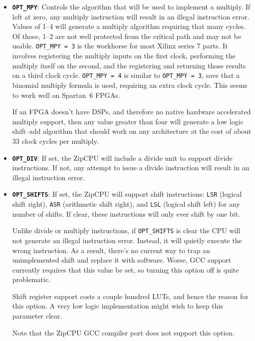 \documentclass{gqtekspec}
\begin{document}
\begin{itemize}
\item {\bf\tt OPT\_MPY}: Controls the algorithm that will be used to implement
	a multiply.  If left at zero, any multiply instruction will result in
	an illegal instruction error.  Values of 1--4 will generate a multiply
	algorithm requiring that many cycles.  Of those, 1--2 are not well
	protected from the critical path and may not be usable.
	{\tt  OPT\_MPY = 3} is the workhorse for most Xilinx series 7 parts.
	It involves registering the multiply inputs on the first clock,
	performing the multiply itself on the second, and the registering and
	returning those results on a third clock cycle.  {\tt  OPT\_MPY = 4}
	is similar to {\tt OPT\_MPY = 3}, save that a binomial multiply formula
	is used, requiring an extra clock cycle.  This seems to work well on
	Spartan~6 FPGAs.

	If an FPGA doesn't have DSPs, and therefore no native hardware
	accelerated multiply support, then any value greater than four will
	generate a low logic shift--add algorithm that should work on any
	architecture at the cost of about 33 clock cycles per multiply.

\item {\bf\tt OPT\_DIV}: If set, the ZipCPU will include a divide unit to
	support divide instructions.  If not, any attempt to issue a divide
	instruction will result in an illegal instruction error.

\item {\bf\tt OPT\_SHIFTS}: If set, the ZipCPU will support shift instructions:
	{\tt LSR} (logical shift right), {\tt ASR} (arithmetic shift right),
	and {\tt LSL} (logical shift left) for any number of shifts.  If clear,
	these instructions will only ever shift by one bit.

	Unlike divide or multiply instructions, if {\tt OPT\_SHIFTS} is clear
	the CPU will not generate an illegal instruction error.  Instead, it
	will quietly execute the wrong instruction.  As a result, there's no
	current way to trap an unimplemented shift and replace it with software.
	Worse, GCC support currently requires that this value be set, so
	turning this option off is quite problematic.

	Shift register support costs a couple hundred LUTs, and hence the
	reason for this option.  A very low logic implementation
	might wish to keep this parameter clear.

	Note that the ZipCPU GCC compiler port does not support this option.


\end{itemize}
\end{document}
